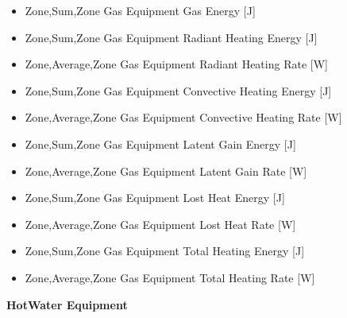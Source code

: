 \begin{itemize}
\item
  Zone,Sum,Zone Gas Equipment Gas Energy {[}J{]}
\item
  Zone,Sum,Zone Gas Equipment Radiant Heating Energy {[}J{]}
\item
  Zone,Average,Zone Gas Equipment Radiant Heating Rate {[}W{]}
\item
  Zone,Sum,Zone Gas Equipment Convective Heating Energy {[}J{]}
\item
  Zone,Average,Zone Gas Equipment Convective Heating Rate {[}W{]}
\item
  Zone,Sum,Zone Gas Equipment Latent Gain Energy {[}J{]}
\item
  Zone,Average,Zone Gas Equipment Latent Gain Rate {[}W{]}
\item
  Zone,Sum,Zone Gas Equipment Lost Heat Energy {[}J{]}
\item
  Zone,Average,Zone Gas Equipment Lost Heat Rate {[}W{]}
\item
  Zone,Sum,Zone Gas Equipment Total Heating Energy {[}J{]}
\item
  Zone,Average,Zone Gas Equipment Total Heating Rate {[}W{]}
\end{itemize}

\textbf{HotWater Equipment}

